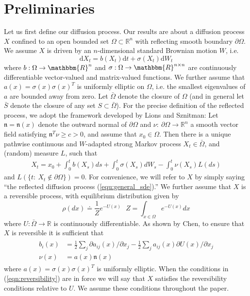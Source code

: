\documentclass[12pt, nofootinbib,english, amsmath, amssymb, aps, priprint, graphicx,floatfix]{revtex4-1}
\theoremstyle{plain}
\theoremstyle{definition}
\theoremstyle{plain}
\newcommand{\normal}{{\mathfrak{n}}}
\begin{document}
\section{Preliminaries}
\label{sec:Preliminaries}

Let us first define our diffusion process.  Our results are about a diffusion process $X$ confined to an open bounded set $\Omega \subset \mathbb{R}^n$ with reflecting smooth boundary $\partial\Omega$.  We assume $X$ is driven by an $n$-dimensional standard Brownian motion $W$, i.e.
\begin{equation}\label{equ:general_sde}\mathrm{d} X_t = b (X_t) \mathrm{d} t + \sigma (X_t) \mathrm{d} W_t \end{equation}
where $b: \Omega \rightarrow \mathbbm{R}^n$ and $\sigma :
\Omega \rightarrow \mathbbm{R}^{n \times n}$ are continuously differentiable vector-valued and matrix-valued functions.  We further assume that $a(x)=\sigma(x)\sigma(x)^T$ is uniformly elliptic on $\Omega$, i.e. the smallest eigenvalues of $a$ are bounded away from zero.  Let $\bar \Omega$ denote the closure of $\Omega$ (and in general let $\bar S$ denote the closure of any set $S\subset \bar \Omega$).  For the precise definition of the reflected process, we adopt the framework developed by Lions and Sznitman\cite{lions1984stochastic}: Let $\normal=\normal(x)$ denote the outward normal of $\partial \Omega$ and $\nu:\ \partial \Omega \rightarrow \mathbb{R}^n$ a smooth vector field satisfying $\normal^T\nu\geq c>0$, and assume that $x_0 \in \Omega$.  Then there is a unique pathwise continuous
and $W$-adapted strong Markov process $X_t\in\bar\Omega$, and (random) measure $L$, such that 
\begin{gather}\label{eq:SDER}
X_t = x_0 + \int_0^t b(X_s)ds + \int_0^t \sigma(X_s)dW_s - \int_0^t \nu(X_s) L(ds)
\end{gather}
and $L(\{t:\ X_t \notin \partial \Omega\})=0$. 
For convenience, we will refer to $X$ by simply saying ``the reflected diffusion process (\ref{equ:general_sde}).'' We further assume that $X$ is a reversible process, with equilibrium distribution given by
\[
\rho(dx)\doteq \frac{1}{Z}e^{-U(x)}\ \ \
Z=\int_{x\in\Omega}e^{-U(x)}dx
\]
where $U:\bar \Omega \rightarrow \mathbb{R}$ is continuously differentiable.  As shown by Chen\cite{chen1993reflecting}, to ensure that $X$ is reversible it is sufficient that 
\begin{align}
\begin{split}
b_i(x)&=\frac{1}{2} \sum_j \partial a_{ij}(x)/\partial x_j - \frac{1}{2}\sum_j a_{ij}(x) \partial U(x)/\partial x_j 
\label{eqn:reversibility} \\
\nu(x)&= a(x) \normal(x) 
\end{split}
\end{align}
where $a(x)=\sigma(x)\sigma(x)^T$ is uniformly elliptic.
When the conditions in (\ref{eqn:reversibility}) are in force
we will say that $X$ satisfies the reversibility conditions relative to $U$.  We assume these conditions throughout the paper.
\end{document}
